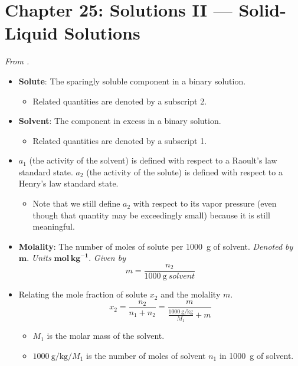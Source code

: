 \documentclass[../notes.tex]{subfiles}
\begin{document}
\section{Chapter 25: Solutions II --- Solid-Liquid Solutions}
\emph{From \textcite{bib:McQuarrieSimon}.}
\begin{itemize}
    \item {}\textbf{Solute}: The sparingly soluble component in a binary solution.
    \begin{itemize}
        \item Related quantities are denoted by a subscript 2.
    \end{itemize}
    \item \textbf{Solvent}: The component in excess in a binary solution.
    \begin{itemize}
        \item Related quantities are denoted by a subscript 1.
    \end{itemize}
    \item $a_1$ (the activity of the solvent) is defined with respect to a Raoult's law standard state. $a_2$ (the activity of the solute) is defined with respect to a Henry's law standard state.
    \begin{itemize}
        \item Note that we still define $a_2$ with respect to its vapor pressure (even though that quantity may be exceedingly small) because it is still meaningful.
    \end{itemize}
    \item \textbf{Molality}: The number of moles of solute per \SI{1000}{\gram} of solvent. \emph{Denoted by} $\bm{m}$. \emph{Units} $\textbf{mol}\,\textbf{kg}^{\bm{-1}}$. \emph{Given by}
    \begin{equation*}
        m = \frac{n_2}{\SI{1000}{\gram\ solvent}}
    \end{equation*}
    \item Relating the mole fraction of solute $x_2$ and the molality $m$.
    \begin{equation*}
        x_2 = \frac{n_2}{n_1+n_2}
        = \frac{m}{\frac{\SI{1000}{\gram\per\kilo\gram}}{M_1}+m}
    \end{equation*}
    \begin{itemize}
        \item $M_1$ is the molar mass of the solvent.
        \item $\SI{1000}{\gram\per\kilo\gram}/M_1$ is the number of moles of solvent $n_1$ in \SI{1000}{\gram} of solvent.

\end{itemize}
\end{itemize}
\end{document}
